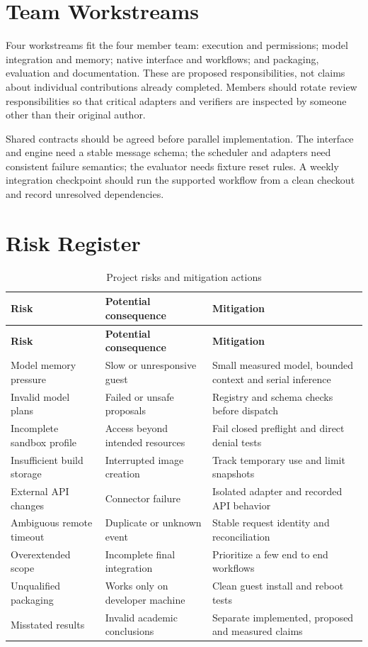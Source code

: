 \section{Team Workstreams}
Four workstreams fit the four member team: execution and permissions; model integration and memory; native interface and workflows; and packaging, evaluation and documentation. These are proposed responsibilities, not claims about individual contributions already completed. Members should rotate review responsibilities so that critical adapters and verifiers are inspected by someone other than their original author.

Shared contracts should be agreed before parallel implementation. The interface and engine need a stable message schema; the scheduler and adapters need consistent failure semantics; the evaluator needs fixture reset rules. A weekly integration checkpoint should run the supported workflow from a clean checkout and record unresolved dependencies.

\section{Risk Register}
\begin{longtable}{P{34mm}P{53mm}P{51mm}}
\caption{Project risks and mitigation actions}\\
\toprule\textbf{Risk} & \textbf{Potential consequence} & \textbf{Mitigation}\\\midrule\endfirsthead
\toprule\textbf{Risk} & \textbf{Potential consequence} & \textbf{Mitigation}\\\midrule\endhead
Model memory pressure & Slow or unresponsive guest & Small measured model, bounded context and serial inference\\
Invalid model plans & Failed or unsafe proposals & Registry and schema checks before dispatch\\
Incomplete sandbox profile & Access beyond intended resources & Fail closed preflight and direct denial tests\\
Insufficient build storage & Interrupted image creation & Track temporary use and limit snapshots\\
External API changes & Connector failure & Isolated adapter and recorded API behavior\\
Ambiguous remote timeout & Duplicate or unknown event & Stable request identity and reconciliation\\
Overextended scope & Incomplete final integration & Prioritize a few end to end workflows\\
Unqualified packaging & Works only on developer machine & Clean guest install and reboot tests\\
Misstated results & Invalid academic conclusions & Separate implemented, proposed and measured claims\\\bottomrule
\end{longtable}

